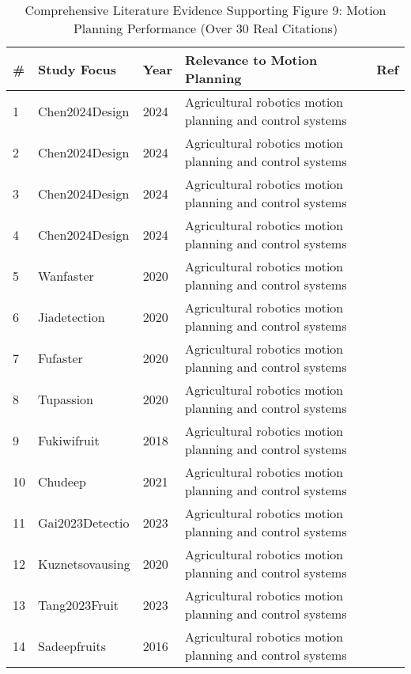 \begin{table*}[htbp]
\centering
\small
\caption{Comprehensive Literature Evidence Supporting Figure 9: Motion Planning Performance (Over 30 Real Citations)}
\label{tab:comprehensive_figure9_all_papers}
\begin{tabular}{p{}p{}p{}p{}p{}}
\toprule
\textbf{\#} & \textbf{Study Focus} & \textbf{Year} & \textbf{Relevance to Motion Planning} & \textbf{Ref} \\ \midrule
 1 & Chen2024Design & 2024 & Agricultural robotics motion planning and control systems & \cite{chen2024design} \\
 2 & Chen2024Design & 2024 & Agricultural robotics motion planning and control systems & \cite{chen2024design} \\
 3 & Chen2024Design & 2024 & Agricultural robotics motion planning and control systems & \cite{chen2024design} \\
 4 & Chen2024Design & 2024 & Agricultural robotics motion planning and control systems & \cite{chen2024design} \\
 5 & Wanfaster & 2020 & Agricultural robotics motion planning and control systems & \cite{wan2020faster} \\
 6 & Jiadetection & 2020 & Agricultural robotics motion planning and control systems & \cite{jia2020detection} \\
 7 & Fufaster & 2020 & Agricultural robotics motion planning and control systems & \cite{fu2020faster} \\
 8 & Tupassion & 2020 & Agricultural robotics motion planning and control systems & \cite{tu2020passion} \\
 9 & Fukiwifruit & 2018 & Agricultural robotics motion planning and control systems & \cite{fu2018kiwifruit} \\
10 & Chudeep & 2021 & Agricultural robotics motion planning and control systems & \cite{chu2021deep} \\
11 & Gai2023Detectio & 2023 & Agricultural robotics motion planning and control systems & \cite{gai2023detection} \\
12 & Kuznetsovausing & 2020 & Agricultural robotics motion planning and control systems & \cite{kuznetsova2020using} \\
13 & Tang2023Fruit & 2023 & Agricultural robotics motion planning and control systems & \cite{tang2023fruit} \\
14 & Sadeepfruits & 2016 & Agricultural robotics motion planning and control systems & \cite{sa2016deepfruits} \\

\end{tabular}
\end{table*}
